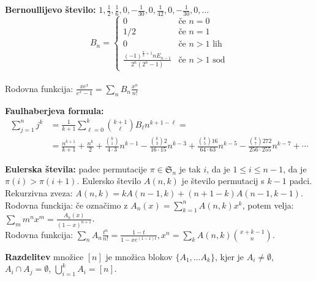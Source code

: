 \documentclass[a4paper, oneside, 12pt]{article}
\theoremstyle{definition}
\newcommand{\per}{\mathfrak{S}}
\begin{document}
\textbf{Bernoullijevo število:} $1, \frac{1}{2}, \frac{1}{6}, 0, - \frac{1}{30}, 0, \frac{1}{42}, 0, - \frac{1}{30}, 0, \ldots$\\
$$B_n = \begin{cases}
    0 &\text{če } n = 0 \\
    1/2 & \text{če } n = 1\\
    0 & \text{če } n>1 \text{ lih}\\
    \frac{(-1)^{\frac{n}{2} + 1} n E_{n-1}}{2^n (2^n - 1)} & \text{če } n > 1 \text{ sod}\end{cases}$$\\
Rodovna funkcija: $\frac{x e^x}{e^x - 1} = \sum_n B_n \frac{x^n}{n!}$

\textbf{Faulhaberjeva formula:}
\begin{align*}
  \sum_{j = 1}^n  j^k &= \frac{1}{k+1} \sum_{\ell=0}^k \binom{k+1}{\ell} B_\ell n^{k+1-\ell} =  \\
  &= \frac{n^{k+1}}{k+1} + \frac{n^k}{2} + \frac{\binom{k}{1}}{4 \cdot 3} n^{k-1} -
  \frac{\binom{k}{3} 2}{16 \cdot 15} n^{k-3} + \frac{\binom{k}{5} 16}{64 \cdot 63} n^{k-5} -
  \frac{\binom{k}{7} 272}{256 \cdot 255} n^{k-7} + \cdots
\end{align*}


\textbf{Eulerska števila:} padec permutacije $\pi \in \per_n$ je tak $i$, da je $1 \leq i \leq n-1$, da je $\pi(i) > \pi(i+1)$.
Eulersko število $A(n, k)$ je število permutacij s $k-1$ padci.\\
Rekurzivna zveza: $A(n, k) = kA(n-1, k) + (n+1-k) A(n-1, k-1)$. \\
Rodovna funckija: če označimo z $A_n(x) = \sum_{k=1}^n A(n, k) x^k$, potem velja:
  $\sum_m m^n x^m = \frac{A_n(x)}{(1-x)^{n+1}}$. \\
Rodovna funkcija: $\sum_n A_n \frac{t^n}{n!} = \frac{1-t}{1-xe^{(1-x)t}}, x^n = \sum_k A(n, k) \binom{x+k-1}{n}$.

\pagebreak
\textbf{Razdelitev} množice $[n]$ je
množica blokov $\{A_1, \ldots A_k\}$, kjer je $A_i \neq \emptyset$, $A_i \cap A_j = \emptyset$,
$\bigcup_{i=1}^k A_i = [n]$.
\end{document}
